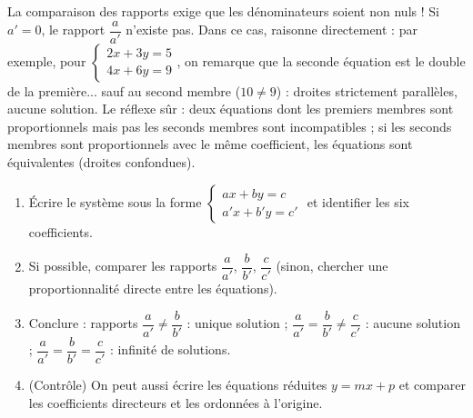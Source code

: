 \documentclass[11pt]{article}
\begin{document}
\begin{attention}
La comparaison des rapports exige que les dénominateurs soient non nuls ! Si $a' = 0$, le rapport $\dfrac{a}{a'}$ n'existe pas. Dans ce cas, raisonne directement : par exemple, pour $\begin{cases} 2x + 3y = 5 \\ 4x + 6y = 9 \end{cases}$, on remarque que la seconde équation est le double de la première... sauf au second membre ($10 \neq 9$) : droites strictement parallèles, aucune solution. Le réflexe sûr : deux équations dont les premiers membres sont proportionnels mais pas les seconds membres sont incompatibles ; si les seconds membres sont proportionnels avec le même coefficient, les équations sont équivalentes (droites confondues).
\end{attention}

\begin{methode}
\begin{enumerate}
\item Écrire le système sous la forme $\begin{cases} ax + by = c \\ a'x + b'y = c' \end{cases}$ et identifier les six coefficients.
\item Si possible, comparer les rapports $\dfrac{a}{a'}$, $\dfrac{b}{b'}$, $\dfrac{c}{c'}$ (sinon, chercher une proportionnalité directe entre les équations).
\item Conclure : rapports $\dfrac{a}{a'} \neq \dfrac{b}{b'}$ : unique solution ; $\dfrac{a}{a'} = \dfrac{b}{b'} \neq \dfrac{c}{c'}$ : aucune solution ; $\dfrac{a}{a'} = \dfrac{b}{b'} = \dfrac{c}{c'}$ : infinité de solutions.
\item (Contrôle) On peut aussi écrire les équations réduites $y = mx + p$ et comparer les coefficients directeurs et les ordonnées à l'origine.
\end{enumerate}
\end{methode}
\end{document}
